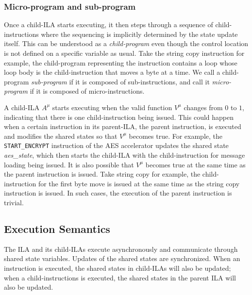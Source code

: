 \documentclass[letterpaper, 11 pt]{article}  %
\begin{document}
\subsubsection*{Micro-program and sub-program}
Once a child-ILA starts executing, it then steps through a sequence of 
child-instructions where the sequencing is implicitly determined by the state
update itself.
This can be understood as a \textit{child-program} even though the control 
location is not defined on a specific variable as usual.
%
Take the string copy instruction for example, the child-program representing 
the instruction contains a loop whose loop body is the child-instruction that 
moves a byte at a time.
% 
We call a child-program \textit{sub-program} if it is composed of 
sub-instructions, and call it \textit{micro-program} if it is composed of 
micro-instructions. 

A child-ILA $A^\mu$ starts executing when the valid function $V^\mu$ changes 
from $0$ to $1$, indicating that there is one child-instruction being issued.
%
This could happen when a certain instruction in its parent-ILA, the parent 
instruction, is executed and modifies the shared states so that $V^\mu$ becomes 
true.
For example, the \texttt{START\_ENCRYPT} instruction of the AES accelerator 
updates the shared state \textit{aes\_state}, which then starts the child-ILA
with the child-instruction for message loading being issued.
%
It is also possible that $V^\mu$ becomes true at the same time as the parent
instruction is issued.
Take string copy for example, the child-instruction for the first
byte move is issued at the same time as the string copy instruction is issued.
In such cases, the execution of the parent instruction is trivial.

\subsection*{Execution Semantics}
The ILA and its child-ILAs execute asynchronously and communicate through shared
state variables. 
Updates of the shared states are synchronized.
When an instruction is executed, the shared states in child-ILAs will also be 
updated; when a child-instructions is executed, the shared states in the parent
ILA will also be updated.
\end{document}
